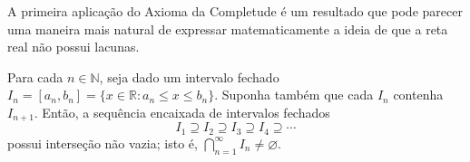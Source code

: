 A primeira aplicação do Axioma da Completude é um resultado que pode parecer uma maneira mais natural de expressar matematicamente a ideia de que a reta real não possui lacunas.

 
\begin{theorem}\label{thm:intervalos-encaixados}
Para cada $n\in\mathbb{N}$, seja dado um intervalo fechado
$I_n=[a_n,b_n]=\{x\in\mathbb{R}:a_n\leq x\leq b_n\}$. Suponha também que cada $I_n$ contenha $I_{n+1}$. Então, a sequência encaixada de intervalos fechados
\[
I_1\supseteq I_2\supseteq I_3\supseteq I_4\supseteq\cdots
\]
possui interseção não vazia; isto é,
$\bigcap_{n=1}^{\infty}I_n\neq\varnothing$.  
\end{theorem}

